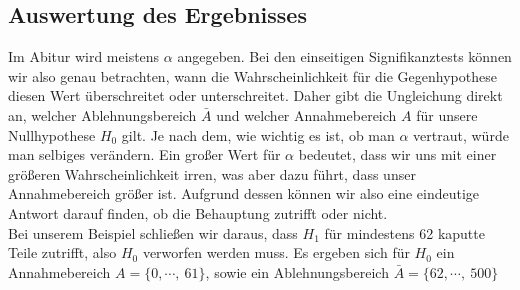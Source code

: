 \subsection{Auswertung des Ergebnisses}
	Im Abitur wird meistens \(\alpha\) angegeben. Bei den einseitigen
	Signifikanztests können wir also genau betrachten, wann die Wahrscheinlichkeit
	für die Gegenhypothese diesen Wert überschreitet oder unterschreitet. Daher
	gibt die Ungleichung direkt an, welcher Ablehnungsbereich \(\bar{A}\) und
	welcher Annahmebereich \(A\) für unsere Nullhypothese \(H_0\) gilt. Je nach
	dem, wie wichtig es ist, ob man \(\alpha\) vertraut, würde man selbiges verändern. Ein
	großer Wert für \(\alpha\) bedeutet, dass wir uns mit einer größeren
	Wahrscheinlichkeit irren, was aber dazu führt, dass unser Annahmebereich größer
	ist. Aufgrund dessen können wir also eine eindeutige Antwort darauf finden, ob
	die Behauptung zutrifft oder nicht.\\
	Bei unserem Beispiel schließen wir daraus, dass \(H_1\) für mindestens 62
	kaputte Teile zutrifft, also \(H_0\) verworfen werden muss.
	Es ergeben sich für \(H_0\) ein Annahmebereich \(A=\{0,\cdots,\ 61\}\), sowie
	ein Ablehnungsbereich \(\bar{A}=\{62,\cdots,\ 500\}\)

